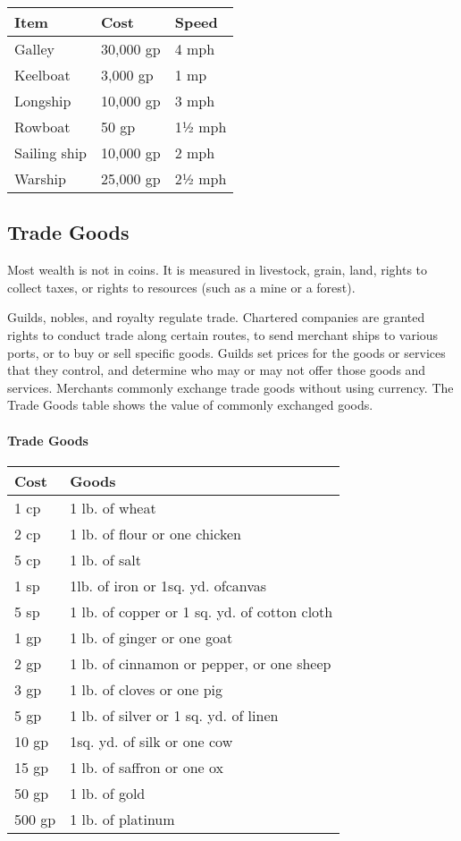 \documentclass[
]{article}
\begin{document}
\begin{longtable}[]{@{}lll@{}}
\toprule
Item & Cost & Speed\tabularnewline
\midrule
\endhead
Galley & 30,000 gp & 4 mph\tabularnewline
Keelboat & 3,000 gp & 1 mp\tabularnewline
Longship & 10,000 gp & 3 mph\tabularnewline
Rowboat & 50 gp & 1½ mph\tabularnewline
Sailing ship & 10,000 gp & 2 mph\tabularnewline
Warship & 25,000 gp & 2½ mph\tabularnewline
\bottomrule
\end{longtable}

\hypertarget{trade-goods}{%
\subsection{Trade Goods}\label{trade-goods}}

Most wealth is not in coins. It is measured in livestock, grain, land,
rights to collect taxes, or rights to resources (such as a mine or a
forest).

Guilds, nobles, and royalty regulate trade. Chartered companies are
granted rights to conduct trade along certain routes, to send merchant
ships to various ports, or to buy or sell specific goods. Guilds set
prices for the goods or services that they control, and determine who
may or may not offer those goods and services. Merchants commonly
exchange trade goods without using currency. The Trade Goods table shows
the value of commonly exchanged goods.

\hypertarget{trade-goods-1}{%
\paragraph{Trade Goods}\label{trade-goods-1}}

\begin{longtable}[]{@{}ll@{}}
\toprule
Cost & Goods\tabularnewline
\midrule
\endhead
1 cp & 1 lb. of wheat\tabularnewline
2 cp & 1 lb. of flour or one chicken\tabularnewline
5 cp & 1 lb. of salt\tabularnewline
1 sp & 1lb. of iron or 1sq. yd. ofcanvas\tabularnewline
5 sp & 1 lb. of copper or 1 sq. yd. of cotton cloth\tabularnewline
1 gp & 1 lb. of ginger or one goat\tabularnewline
2 gp & 1 lb. of cinnamon or pepper, or one sheep\tabularnewline
3 gp & 1 lb. of cloves or one pig\tabularnewline
5 gp & 1 lb. of silver or 1 sq. yd. of linen\tabularnewline
10 gp & 1sq. yd. of silk or one cow\tabularnewline
15 gp & 1 lb. of saffron or one ox\tabularnewline
50 gp & 1 lb. of gold\tabularnewline
500 gp & 1 lb. of platinum\tabularnewline
\bottomrule
\end{longtable}
\end{document}

